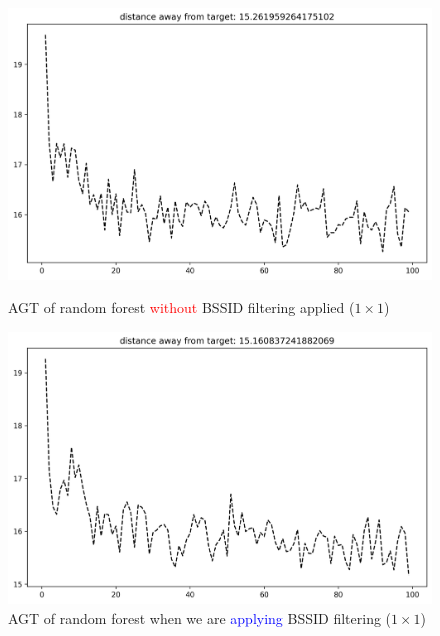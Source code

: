 \documentclass[runningheads]{llncs}
\begin{document}
\begin{figure}[tbh!]
	\begin{minipage}{0.48\linewidth}
		\centering
		\includegraphics[width=\linewidth]{figures/image7.png}
		\caption{AGT of random forest \textcolor{red}{without} BSSID filtering applied ($1\times1$)}
		\label{fig:rf_agt_nofilter}
	\end{minipage}
	\hfill
        \begin{minipage}{0.48\linewidth}
		\centering
		\includegraphics[width=\linewidth]{figures/image4.png}
		\caption{AGT of random forest when we are \textcolor{blue}{applying} BSSID filtering ($1\times1$)}
		\label{fig:rf_agt_filter}
	\end{minipage}
	
\end{figure}
\end{document}
